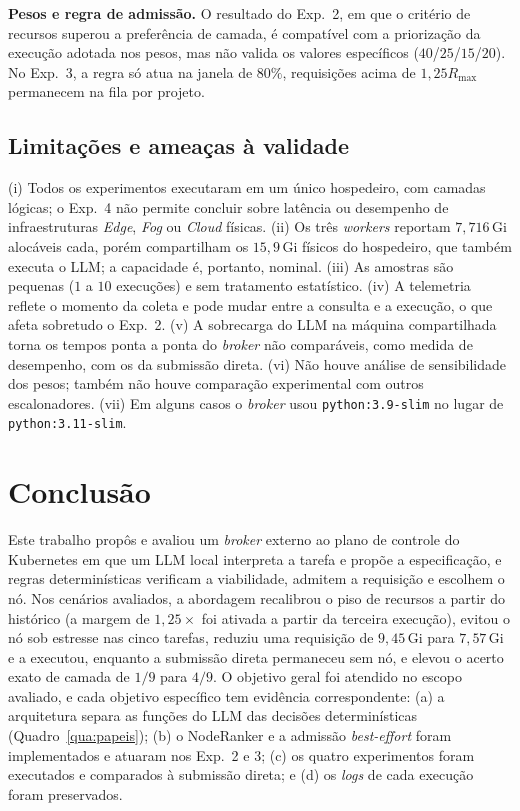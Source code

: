 \documentclass[11pt,a4paper]{article}
\newcommand{\gi}[1]{\ensuremath{#1}\,Gi}
\begin{document}
\textbf{Pesos e regra de admissão.} O resultado do Exp.~2, em que o critério
de recursos superou a preferência de camada, é compatível com a priorização
da execução adotada nos pesos, mas não valida os valores específicos
($40$/$25$/$15$/$20$). No Exp.~3, a regra só atua na janela de $80\%$,
requisições acima de $1{,}25R_{\max}$ permanecem na fila por projeto.

\subsection{Limitações e ameaças à validade}\label{sec:ameacas}

(i) Todos os experimentos executaram em um único hospedeiro, com camadas
lógicas; o Exp.~4 não permite concluir sobre latência ou desempenho de
infraestruturas \textit{Edge}, \textit{Fog} ou \textit{Cloud} físicas.
(ii) Os três \textit{workers} reportam \gi{7,716} alocáveis cada, porém
compartilham os \gi{15,9} físicos do hospedeiro, que também executa o LLM;
a capacidade é, portanto, nominal. (iii) As amostras são pequenas ($1$ a
$10$ execuções) e sem tratamento estatístico. (iv) A telemetria reflete o
momento da coleta e pode mudar entre a consulta e a execução, o que afeta
sobretudo o Exp.~2. (v) A sobrecarga do LLM na máquina compartilhada torna
os tempos ponta a ponta do \textit{broker} não comparáveis, como medida de
desempenho, com os da submissão direta. (vi) Não houve análise de
sensibilidade dos pesos; também não houve comparação experimental com outros
escalonadores. (vii) Em alguns casos o \textit{broker} usou
\texttt{python:3.9-slim} no lugar de \texttt{python:3.11-slim}.

\section{Conclusão}\label{sec:conclusao}

Este trabalho propôs e avaliou um \textit{broker} externo ao plano de
controle do Kubernetes em que um LLM local interpreta a tarefa e propõe a
especificação, e regras determinísticas verificam a viabilidade, admitem a
requisição e escolhem o nó. Nos cenários avaliados, a abordagem recalibrou o
piso de recursos a partir do histórico (a margem de $1{,}25\times$ foi
ativada a partir da terceira execução), evitou o nó sob estresse nas cinco
tarefas, reduziu uma requisição de \gi{9,45} para \gi{7,57} e a executou,
enquanto a submissão direta permaneceu sem nó, e elevou o acerto exato de
camada de $1/9$ para $4/9$. O objetivo geral foi atendido no escopo
avaliado, e cada objetivo específico tem evidência correspondente: (a) a
arquitetura separa as funções do LLM das decisões determinísticas
(Quadro~\ref{qua:papeis}); (b) o NodeRanker e a admissão \textit{best-effort}
foram implementados e atuaram nos Exp.~2 e 3; (c) os quatro experimentos
foram executados e comparados à submissão direta; e (d) os \textit{logs} de
cada execução foram preservados.
\end{document}
